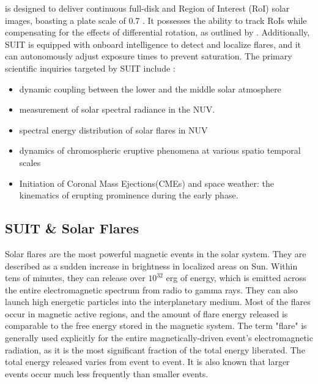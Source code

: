 {{\suit} is designed to deliver continuous full-disk and Region of Interest (RoI) solar images, boasting a plate scale of 0.7 \arcsec. It possesses the ability to track RoIs while compensating for the effects of differential rotation, as outlined by \cite{suit_algo}. Additionally, SUIT is equipped with onboard intelligence to detect and localize flares, and it can autonomously adjust exposure times to prevent saturation. The primary scientific inquiries targeted by SUIT include \citep{suit_science, suit_main}:

\begin{itemize}
    \item dynamic coupling between the lower and the middle solar atmosphere
    \item measurement of solar spectral radiance in the NUV.
    \item spectral energy distribution of solar flares in NUV
    \item dynamics of chromospheric eruptive phenomena at various spatio temporal scales
    \item Initiation of Coronal Mass Ejections(CMEs) and space weather: the kinematics of erupting prominence during the early phase.
\end{itemize}

\subsection{SUIT \& Solar Flares}\label{sec:suit_and_flare}

Solar flares are the most powerful magnetic events in the solar system. They are described as a sudden increase in brightness in localized areas on Sun. Within tens of minutes, they can release over $10^{32}$ erg of energy, which is emitted across the entire electromagnetic spectrum from radio to gamma rays. They can also launch high energetic particles into the interplanetary medium. Most of the flares occur in magnetic active regions, and the amount of flare energy released is comparable to the free energy stored in the magnetic system. The term "flare" is generally used explicitly for the entire magnetically-driven event's electromagnetic radiation, as it is the most significant fraction of the total energy liberated. The total energy released varies from event to event. It is also known that larger events occur much less frequently than smaller events.

}

